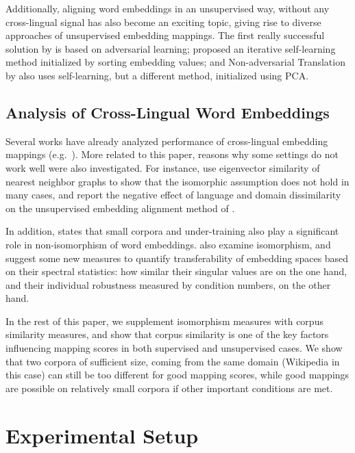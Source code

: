 \documentclass[11pt]{article}
\begin{document}
	Additionally, aligning word embeddings in an unsupervised way, without any cross-lingual signal has also become an exciting topic, giving rise to diverse approaches of unsupervised embedding mappings. The first really successful solution by  is based on adversarial learning;  proposed an iterative self-learning method initialized by sorting embedding values; and Non-adversarial Translation by  also uses self-learning, but a different method, initialized using PCA.
	
\subsection{Analysis of Cross-Lingual Word Embeddings}
	Several works have already analyzed performance of cross-lingual embedding mappings (e.g.~\citealp{kementchedjhieva-etal-2019-lost, glavas-etal-2019-properly, vulic-etal-2019-really}). More related to this paper, reasons why some settings do not work well were also investigated. 
	For instance,  use eigenvector similarity of nearest neighbor graphs to show that the isomorphic assumption does not hold in many cases, and report the negative effect of language and domain dissimilarity on the unsupervised embedding alignment method of . 
	
	In addition,  states that small corpora and under-training also play a significant role in non-isomorphism of word embeddings. 
	 also examine isomorphism, and suggest some new measures to quantify transferability of embedding spaces based on their spectral statistics: how similar their singular values are on the one hand, and their individual robustness measured by condition numbers, on the other hand.
	
	In the rest of this paper, we supplement isomorphism measures with corpus similarity measures, and show that corpus similarity is one of the key factors influencing mapping scores in both supervised and unsupervised cases. We show that two corpora of sufficient size, coming from the same domain (Wikipedia in this case) can still be too different for good mapping scores, while good mappings are possible on relatively small corpora if other important conditions are met.

\section{Experimental Setup}
\end{document}
